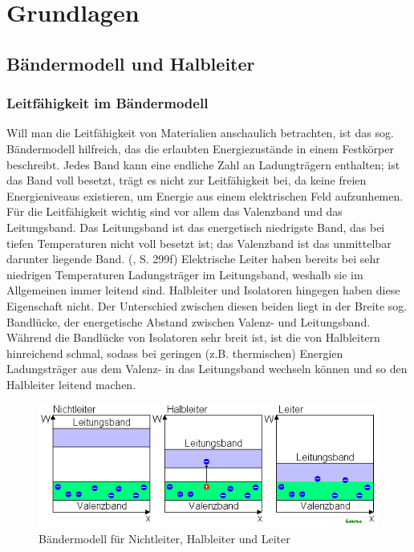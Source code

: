 
\chapter{Grundlagen}
\section{Bändermodell und Halbleiter}
\subsection{Leitfähigkeit im Bändermodell}
Will man die Leitfähigkeit von Materialien anschaulich betrachten, ist das sog. Bändermodell hilfreich, das die erlaubten Energiezustände in einem Festkörper beschreibt. Jedes Band kann eine endliche Zahl an Ladungträgern enthalten; ist das Band voll besetzt, trägt es nicht zur Leitfähigkeit bei, da keine freien Energieniveaus existieren, um Energie aus einem elektrischen Feld aufzunhemen. Für die Leitfähigkeit wichtig sind vor allem das Valenzband und das Leitungsband. Das Leitungsband ist das energetisch niedrigste Band, das bei tiefen Temperaturen nicht voll besetzt ist; das Valenzband ist das unmittelbar darunter liegende Band. (\cite{Eichler2001}, S. 299f)
Elektrische Leiter haben bereits bei sehr niedrigen Temperaturen Ladungsträger im Leitungsband, weshalb sie im Allgemeinen immer leitend sind. Halbleiter und Isolatoren hingegen haben diese Eigenschaft nicht. Der Unterschied zwischen diesen beiden liegt in der Breite sog. Bandlücke, der energetische Abstand zwischen Valenz- und Leitungsband. Während die Bandlücke von Isolatoren sehr breit ist, ist die von Halbleitern hinreichend schmal, sodass bei geringen (z.B. thermischen) Energien Ladungsträger aus dem Valenz- in das Leitungsband wechseln können und so den Halbleiter leitend machen. \\
\begin{figure}[h]
    \centering
    \includegraphics[scale=0.75]{Bilder/Baendermodell.png}
    \caption{Bändermodell für Nichtleiter, Halbleiter und Leiter \protect \footnotemark}
\end{figure}

